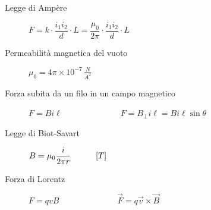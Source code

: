 \documentclass[a4paper,11pt,italian]{article}
\begin{document}
\begin{description}
  \item[Legge di Ampère]
  $ F = k\cdot  \dfrac{i_1 i_2}{d}\cdot L = \dfrac{\mu_0}{2\pi} \cdot \dfrac{i_1 i_2}{d}\cdot L $
  
  \item[Permeabilità magnetica del vuoto]
  $ \mu_0 = 4\pi \times 10^{-7} \, \frac{N}{A^2} $
  
  \item[Forza subita da un filo in un campo magnetico] 
  $ F = Bi\ell $~~~~~~~~~~~~~~$ F = B_{\perp } i\ell = Bi\ell\sin\theta$
  
  
  \item[Legge di Biot-Savart] 
  $ B = \mu_0\dfrac{i}{2\pi r} \hspace*{3em} [T] $

  
  
  \item[Forza di Lorentz] 
  $F = qvB $~~~~~~~~~~~~~~$ \vec{F} = q \vec{v} \times \vec{B} $
%   


\end{description}
\end{document}
